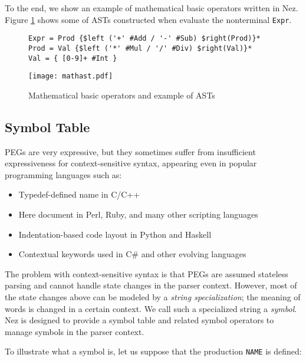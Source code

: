 \documentclass[preprint]{sigplanconf}
\begin{document}
To the end, we show an example of mathematical basic operators written in Nez. Figure \ref{fig:math} shows some of ASTs constructed when evaluate the nonterminal {\tt Expr}.  

\begin{figure}[tb]
\begin{small}
\begin{verbatim}
Expr = Prod {$left ('+' #Add / '-' #Sub) $right(Prod)}*
Prod = Val {$left ('*' #Mul / '/' #Div) $right(Val)}*
Val = { [0-9]+ #Int }
\end{verbatim}
\end{small}
\begin{center}
\texttt{[image: mathast.pdf]}
\end{center}
\caption{Mathematical basic operators and example of ASTs}
\label{fig:math}
\end{figure}

\subsection{Symbol Table}

PEGs are very expressive, but they sometimes suffer from insufficient expressiveness for context-sensitive syntax, appearing even in popular programming languages such as: 

\begin{itemize}
\item Typedef-defined name in C/C++ \cite{POPL04_PEG,PLDI06_Rats}
\item Here document in Perl, Ruby, and many other scripting languages
\item Indentation-based code layout in Python and Haskell \cite{POPL13_Indentation}
\item Contextual keywords used in C\# and other evolving languages\cite{OOPSLA06_AspectJ}
\end{itemize}

The problem with context-sensitive syntax is that PEGs are assumed stateless parsing and cannot handle state changes in the parser context. However, most of the state changes above can be modeled by a {\em string specialization};  the meaning of words is changed in a certain context. We call such a specialized string a {\em symbol}. Nez is designed to provide a symbol table and related symbol operators to manage symbols in the parser context.

To illustrate what a symbol is, let us suppose that the production {\tt NAME} is defined:
\end{document}
